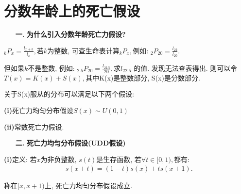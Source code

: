 \documentclass[a4paper,10pt]{ctexbook}
\newcommand{\hei}{\CJKfamily{hei}}      %
\begin{document}
\section{分数年龄上的死亡假设}
\begin{itemize}
    \item[{\bf\hei 一.}]{\bf\hei 为什么引入分数年龄死亡力假设?}
\end{itemize}

$_{k}P_{x}=\frac{l_{x+k}}{l_{x}},$若$k$为整数, 可查生命表计算$_{k}P_{x},$例如: $_{2}P_{20}=\frac{l_{22}}{l_{20}}.$

但如果$k$不是整数, 例如: $_{2.5}P_{20}=\frac{l_{22.5}}{20},$求$l_{22.5}$ 的值. 发现无法查表得出.
则可以令$T(x)=K(x)+S(x),$其中K(x)是整数部分, S(x)是分数部分.

关于S(x)服从的分布可以满足以下两个假设:

{\rm\bf(i)}死亡力均匀分布假设$S(x)\sim U(0,1)$

{\rm\bf(ii)}常数死亡力假设.

\begin{itemize}
    \item[{\bf\hei 二.}]{\bf\hei 死亡力均匀分布假设(UDD假设)}
\end{itemize}

{\rm\bf(i)}定义: 若$x$为非负整数, $s(t)$是生存函数, 若$\forall t\in [0,1),$都有:
\begin{align}\label{tul}
     & s(x+t)=(1-t)s(x)+ts(x+1).
\end{align}

称在$[x,x+1)$上, 死亡力均匀分布假设成立.
\end{document}
